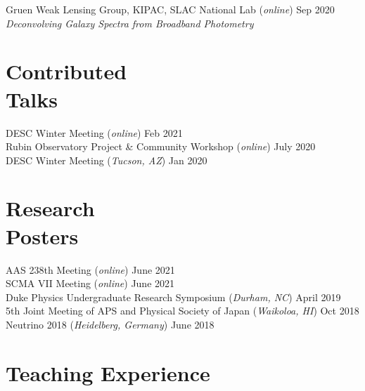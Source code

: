\documentclass[margin]{res}
\begin{document}
\begin{resume}
\vspace{-3.5mm} \hangindent=2mm
Gruen Weak Lensing Group, KIPAC, SLAC National Lab (\textit{online}) \hfill Sep 2020 \\ \textit{Deconvolving Galaxy Spectra from Broadband Photometry} \\

\section{Contributed \\Talks}

DESC Winter Meeting (\textit{online}) \hfill Feb 2021 \\
Rubin Observatory Project \& Community Workshop (\textit{online}) \hfill July 2020 \\
DESC Winter Meeting (\textit{Tucson, AZ}) \hfill Jan 2020 \\

\section{Research \\Posters}

AAS 238th Meeting (\textit{online}) \hfill June 2021 \\
SCMA VII Meeting (\textit{online}) \hfill June 2021 \\
Duke Physics Undergraduate Research Symposium (\textit{Durham, NC}) \hfill April 2019 \\
5th Joint Meeting of APS and Physical Society of Japan (\textit{Waikoloa, HI}) \hfill Oct 2018 \\
Neutrino 2018 (\textit{Heidelberg, Germany}) \hfill June 2018 \\

\section{Teaching Experience}


\end{resume}
\end{document}

